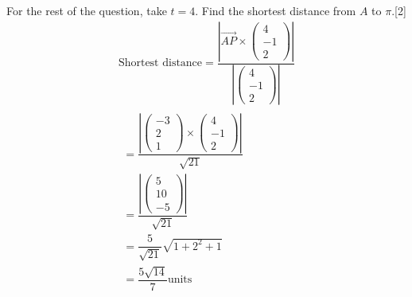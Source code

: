 \documentclass[12pt, a4 paper]{article}
\begin{document}
\begin{outline}[enumerate]
					\color{black}
					For the rest of the question, take $t = 4$.
					\2	Find the shortest distance from $A$ to $\pi $.\hfill[2]
					\color{blue}
					\begin{align*}
						{\textrm{Shortest distance}} = \dfrac{{\left| {\overrightarrow {AP}  \times \left( {\begin{array}{*{20}{c}}4 \\{ - 1}\\2\end{array}} \right)} \right|}}{{\left| {\left( {\begin{array}{*{20}{c}}4\\{ - 1}\\2\end{array}} \right)} \right|}}\\
						\begin{array}{c} = \dfrac{{\left| {\left( {\begin{array}{*{20}{c}}{ - 3}                                     \\2\\1\end{array}} \right) \times \left( {\begin{array}{*{20}{c}}4\\{ - 1}\\2\end{array}} \right)} \right|}}{{\sqrt {21} }}\\ = \dfrac{{\left| {\left( {\begin{array}{*{20}{c}}5\\{10}\\{ - 5}\end{array}} \right)} \right|}}{{\sqrt {21} }}\\ = \dfrac{5}{{\sqrt {21} }}\sqrt {1 + {2^2} + 1} \\ = \dfrac{{5\sqrt {14} }}{7}{\textrm{units}}\end{array}
					\end{align*}


\end{outline}
\end{document}
